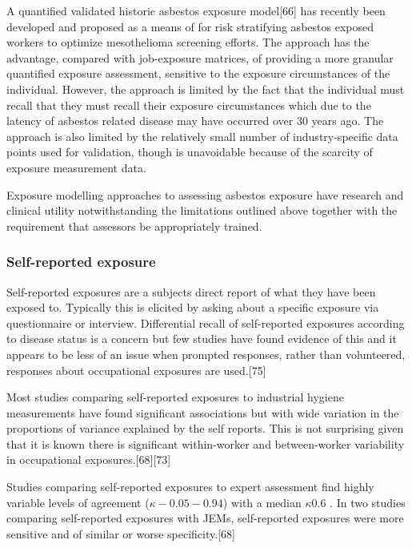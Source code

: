 \documentclass[12pt,a4paper,]{report}
\begin{document}
A quantified validated historic asbestos exposure model{[}66{]} has
recently been developed and proposed as a means of for risk stratifying
asbestos exposed workers to optimize mesothelioma screening efforts. The
approach has the advantage, compared with job-exposure matrices, of
providing a more granular quantified exposure assessment, sensitive to
the exposure circumstances of the individual. However, the approach is
limited by the fact that the individual must recall that they must
recall their exposure circumstances which due to the latency of asbestos
related disease may have occurred over 30 years ago. The approach is
also limited by the relatively small number of industry-specific data
points used for validation, though is unavoidable because of the
scarcity of exposure measurement data.

Exposure modelling approaches to assessing asbestos exposure have
research and clinical utility notwithstanding the limitations outlined
above together with the requirement that assessors be appropriately
trained.

\hypertarget{self-reported-exposure}{%
\subsubsection{Self-reported exposure}\label{self-reported-exposure}}

Self-reported exposures are a subjects direct report of what they have
been exposed to. Typically this is elicited by asking about a specific
exposure via questionnaire or interview. Differential recall of
self-reported exposures according to disease status is a concern but few
studies have found evidence of this and it appears to be less of an
issue when prompted responses, rather than volunteered, responses about
occupational exposures are used.{[}75{]}

Most studies comparing self-reported exposures to industrial hygiene
measurements have found significant associations but with wide variation
in the proportions of variance explained by the self reports. This is
not surprising given that it is known there is significant within-worker
and between-worker variability in occupational
exposures.{[}68{]}{[}73{]}

Studies comparing self-reported exposures to expert assessment find
highly variable levels of agreement (\ensuremath{\kappa -0.05 - 0.94})
with a median \ensuremath{\kappa 0.6} . In two studies comparing
self-reported exposures with JEMs, self-reported exposures were more
sensitive and of similar or worse specificity.{[}68{]}
\end{document}
